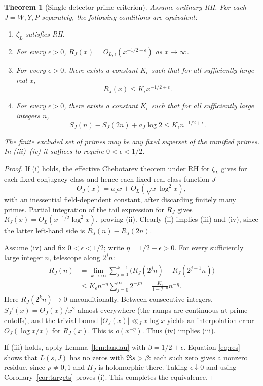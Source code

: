 \documentclass[11pt,letterpaper]{article}
\newtheorem{theorem}{Theorem}[section]
\theoremstyle{remark}\newtheorem{remark}[theorem]{Remark}
\begin{document}
\begin{theorem}[Single-detector prime criterion]\label{thm:criterion}
Assume ordinary RH. For each $J=W,Y,P$ separately, the following conditions are equivalent:
\begin{enumerate}[label=(\roman*)]
\item $\zeta_L$ satisfies RH.
\item For every $\epsilon>0$, $R_J(x)=O_{L,\epsilon}(x^{-1/2+\epsilon})$ as $x\to\infty$.
\item For every $\epsilon>0$, there exists a constant $K_\epsilon$ such that for all sufficiently large real $x$,
\[
 R_J(x)\le K_\epsilon x^{-1/2+\epsilon}.
\]
\item For every $\epsilon>0$, there exists a constant $K_\epsilon$ such that for all sufficiently large integers $n$,
\begin{equation}\label{eq:dyadic}
 S_J(n)-S_J(2n)+a_J\log2\le K_\epsilon n^{-1/2+\epsilon}.
\end{equation}
\end{enumerate}
The finite excluded set of primes may be any fixed superset of the ramified primes. In (iii)--(iv) it suffices to require $0<\epsilon<1/2$.
\end{theorem}
\begin{proof}
If (i) holds, the effective Chebotarev theorem under RH for $\zeta_L$ gives for each fixed conjugacy class and hence each fixed real class function $J$
\[
 \Theta_J(x)=a_Jx+O_L(\sqrt x\log^2 x),
\]
with an inessential field-dependent constant, after discarding finitely many primes. Partial integration of the tail expression for $R_J$ gives $R_J(x)=O_L(x^{-1/2}\log^2 x)$, proving (ii). Clearly (ii) implies (iii) and (iv), since the latter left-hand side is $R_J(n)-R_J(2n)$.

Assume (iv) and fix $0<\epsilon<1/2$; write $\eta=1/2-\epsilon>0$. For every sufficiently large integer $n$, telescope along $2^j n$:
\begin{align*}
 R_J(n)&=\lim_{k\to\infty}\sum_{j=0}^{k-1}\bigl(R_J(2^j n)-R_J(2^{j+1}n)\bigr)\\
 &\le K_\epsilon n^{-\eta}\sum_{j=0}^\infty 2^{-j\eta}
 =\frac{K_\epsilon}{1-2^{-\eta}}n^{-\eta}.
\end{align*}
Here $R_J(2^kn)\to0$ unconditionally. Between consecutive integers, $S_J'(x)=\Theta_J(x)/x^2$ almost everywhere (the ramps are continuous at prime cutoffs), and the trivial bound $|\Theta_J(x)|\ll_J x\log x$ yields an interpolation error $O_J(\log x/x)$ for $R_J(x)$. This is $o(x^{-\eta})$. Thus (iv) implies (iii).

If (iii) holds, apply Lemma~\ref{lem:landau} with $\beta=1/2+\epsilon$. Equation \eqref{eq:res} shows that $L(s,J)$ has no zeros with $\Re s>\beta$: each such zero gives a nonzero residue, since $\rho\ne0,1$ and $H_J$ is holomorphic there. Taking $\epsilon\downarrow0$ and using Corollary~\ref{cor:targets} proves (i). This completes the equivalence.
\end{proof}
\end{document}
